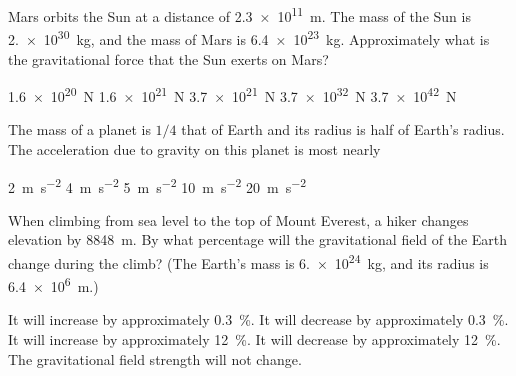 \documentclass{../../../oss-apphys-exam}
\begin{document}
\begin{multicols*}{2}
\begin{questions}
    \question Mars orbits the Sun at a distance of \SI{2.3e11}{\metre}. The
    mass of the Sun is \SI{2.e30}{\kilo\gram}, and the mass of Mars is
    \SI{6.4e23}{\kilo\gram}. Approximately what is the gravitational force that
    the Sun exerts on Mars?
    \begin{choices}
      \choice\SI{1.6e20}{\newton}
      \choice\SI{1.6e21}{\newton}
      \choice\SI{3.7e21}{\newton}
      \choice\SI{3.7e32}{\newton}
      \choice\SI{3.7e42}{\newton}
    \end{choices}

    \question The mass of a planet is $1/4$ that of Earth and its radius is
    half of Earth's radius. The acceleration due to gravity on this planet is
    most nearly
    \begin{choices}
      \choice\SI{2}{\metre\per\second\squared}
      \choice\SI{4}{\metre\per\second\squared}
      \choice\SI{5}{\metre\per\second\squared}
      \choice\SI{10}{\metre\per\second\squared}
      \choice\SI{20}{\metre\per\second\squared}
    \end{choices}
    
    \question When climbing from sea level to the top of Mount Everest, a hiker
    changes elevation by \SI{8848}{\metre}. By what percentage will the
    gravitational field of the Earth change during the climb? (The Earth's
    mass is \SI{6.e24}{\kilo\gram}, and its radius is \SI{6.4e6}{\metre}.)
    \begin{choices}
      \choice It will increase by approximately \SI{.3}{\percent}.
      \choice It will decrease by approximately \SI{.3}{\percent}.
      \choice It will increase by approximately \SI{12}{\percent}.
      \choice It will decrease by approximately \SI{12}{\percent}.
      \choice The gravitational field strength will not change.
    \end{choices}
    \columnbreak
    

\end{questions}
\end{multicols*}
\end{document}
